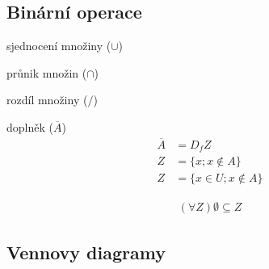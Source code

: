 \subsection*{Binární operace}
\begin{description}
  \item sjednocení množiny ($\cup$)
  \item průnik množin ($\cap$)
  \item rozdíl množiny ($/$)
  \item doplněk ($\overline{A}$)
  \begin{align*}
    \overline{A} &= D_f Z\\
    Z &= \{x;x\notin A \} \\
    Z &= \{x\in U; x\notin A\}
  \end{align*}
\end{description}
\pagebreak
\begin{align*}
  (\forall Z) \emptyset \subseteq Z
\end{align*}
\subsection*{Vennovy diagramy}


